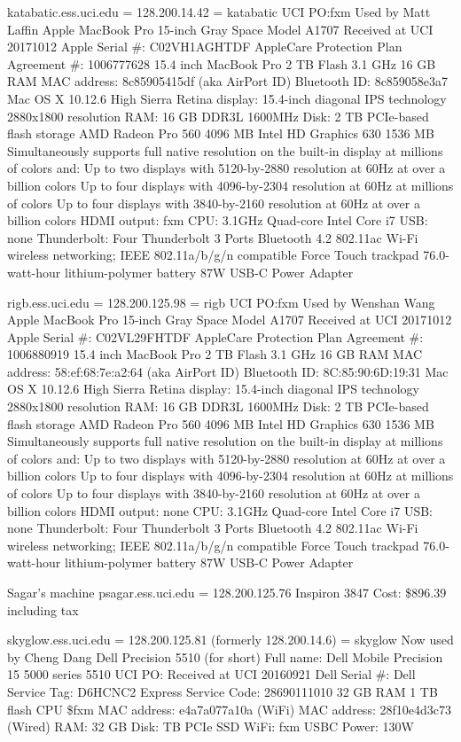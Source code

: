\documentclass[12pt,twoside]{article}
\begin{document}
katabatic.ess.uci.edu = 128.200.14.42 = katabatic
UCI PO:fxm
Used by Matt Laffin
Apple MacBook Pro 15-inch Gray Space
Model A1707
Received at UCI 20171012
Apple Serial \#: C02VH1AGHTDF
AppleCare Protection Plan Agreement \#: 1006777628
15.4 inch MacBook Pro
2 TB Flash
3.1 GHz
16 GB RAM
MAC address: 8c85905415df (aka AirPort ID)
Bluetooth ID: 8c859058e3a7
Mac OS X 10.12.6 High Sierra
Retina display: 15.4-inch diagonal
IPS technology 2880x1800 resolution
RAM: 16 GB DDR3L 1600MHz
Disk: 2 TB PCIe-based flash storage
AMD Radeon Pro 560 4096 MB Intel HD Graphics 630 1536 MB
Simultaneously supports full native resolution on the built-in display at millions of colors and:
Up to two displays with 5120-by-2880 resolution at 60Hz at over a billion colors
Up to four displays with 4096-by-2304 resolution at 60Hz at millions of colors
Up to four displays with 3840-by-2160 resolution at 60Hz at over a billion colors
HDMI output: fxm
CPU: 3.1GHz Quad-core Intel Core i7
USB: none
Thunderbolt: Four Thunderbolt 3 Ports
Bluetooth 4.2
802.11ac Wi-Fi wireless networking; IEEE 802.11a/b/g/n compatible
Force Touch trackpad
76.0-watt-hour lithium-polymer battery
87W USB-C Power Adapter

rigb.ess.uci.edu = 128.200.125.98 = rigb
UCI PO:fxm
Used by Wenshan Wang
Apple MacBook Pro 15-inch Gray Space
Model A1707
Received at UCI 20171012
Apple Serial \#: C02VL29FHTDF
AppleCare Protection Plan Agreement \#: 1006880919
15.4 inch MacBook Pro
2 TB Flash
3.1 GHz
16 GB RAM
MAC address: 58:ef:68:7e:a2:64 (aka AirPort ID)
Bluetooth ID: 8C:85:90:6D:19:31
Mac OS X 10.12.6 High Sierra
Retina display: 15.4-inch diagonal
IPS technology 2880x1800 resolution
RAM: 16 GB DDR3L 1600MHz
Disk: 2 TB PCIe-based flash storage
AMD Radeon Pro 560 4096 MB Intel HD Graphics 630 1536 MB
Simultaneously supports full native resolution on the built-in display at millions of colors and:
Up to two displays with 5120-by-2880 resolution at 60Hz at over a billion colors
Up to four displays with 4096-by-2304 resolution at 60Hz at millions of colors
Up to four displays with 3840-by-2160 resolution at 60Hz at over a billion colors
HDMI output: none
CPU: 3.1GHz Quad-core Intel Core i7
USB: none
Thunderbolt: Four Thunderbolt 3 Ports
Bluetooth 4.2
802.11ac Wi-Fi wireless networking; IEEE 802.11a/b/g/n compatible
Force Touch trackpad
76.0-watt-hour lithium-polymer battery
87W USB-C Power Adapter

Sagar's machine
psagar.ess.uci.edu = 128.200.125.76
Inspiron 3847
Cost: \$896.39 including tax

skyglow.ess.uci.edu = 128.200.125.81 (formerly 128.200.14.6) = skyglow
Now used by Cheng Dang
Dell Precision 5510 (for short)
Full name: Dell Mobile Precision 15 5000 series 5510
UCI PO: 
Received at UCI 20160921
Dell Serial \#: 
Dell Service Tag: D6HCNC2
Express Service Code: 28690111010
32 GB RAM
1 TB flash
CPU 
\$fxm
MAC address: e4a7a077a10a (WiFi)
MAC address: 28f10e4d3c73 (Wired)
RAM: 32 GB 
Disk:  TB PCIe SSD
WiFi: fxm
USBC
Power: 130W
\end{document}
